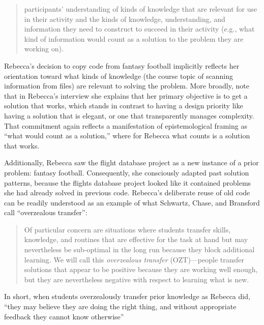 \begin{quote}
  participants' understanding of kinds of knowledge that are relevant for
  use in their activity and the kinds of knowledge, understanding, and
  information they need to construct to succeed in their activity (e.g.,
  what kind of information would count as a solution to the problem they
  are working on). \cite{vandesande_achieving_2012}
\end{quote}

Rebecca's decision to copy code from fantasy football implicitly
reflects her orientation toward what kinds of knowledge (the course
topic of scanning information from files) are relevant to solving the
problem. More broadly, note that in Rebecca's interview she explains
that her primary objective is to get a solution that works, which stands
in contrast to having a design priority like having a solution that is
elegant, or one that transparently manages complexity. That commitment
again reflects a manifestation of epistemological framing as ``what
would count as a solution,'' where for Rebecca what counts is a solution
that works.

Additionally, Rebecca saw the flight database project as a new instance
of a prior problem: fantasy football. Consequently, she consciously
adapted past solution patterns, because the flights database project
looked like it contained problems she had already solved in previous
code. Rebecca's deliberate reuse of old code can be readily understood
as an example of what Schwartz, Chase, and Bransford \cite{schwartz_resisting_2012} call
``overzealous transfer'':

\begin{quote}
  Of particular concern are situations where students transfer skills,
  knowledge, and routines that are effective for the task at hand but may
  nevertheless be sub-optimal in the long run because they block
  additional learning. We will call this \emph{overzealous transfer}
  (OZT)---people transfer solutions that appear to be positive because
  they are working well enough, but they are nevertheless negative with
  respect to learning what is new. \cite{schwartz_resisting_2012}
\end{quote}

In short, when students overzealously transfer prior knowledge as
Rebecca did, ``they may believe they are doing the right thing, and
without appropriate feedback they cannot know otherwise'' \cite{schwartz_resisting_2012}

